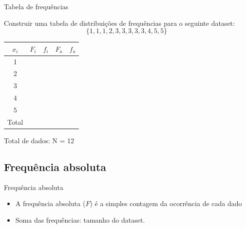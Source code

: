 \documentclass{beamer}
\begin{document}
\begin{frame}{Tabela de frequências}
  \begin{example}
    Construir uma tabela de distribuições de frequências para o
    seguinte dataset:
    $$ \{ 1,1,1,2,3,3,3,3,3,4,5,5 \}$$
    \begin{center}
      \begin{tabular}[h]{|c|c|c|c|c|}
        \hline
        $x_i$ & $F_i$ & $f_i$ & $F_a$ & $f_a$\\
        \hline
        1 & & & & \\
        \hline
        2 & & & & \\
        \hline
        3 & & & & \\
        \hline
        4 & & & & \\
        \hline
        5 & & & & \\
        \hline
        \hline
        Total & & & & \\
        \hline
      \end{tabular}
      Total de dados: N = 12
    \end{center}
  \end{example}
\end{frame}

\subsection{Frequência absoluta}

\begin{frame}{Frequência absoluta}
  \begin{itemize}
  \item A frequência absoluta ($F$) é a simples contagem da ocorrência
    de cada dado
  \item Soma das frequências: tamanho do dataset.
  \end{itemize}
\end{frame}
\end{document}

